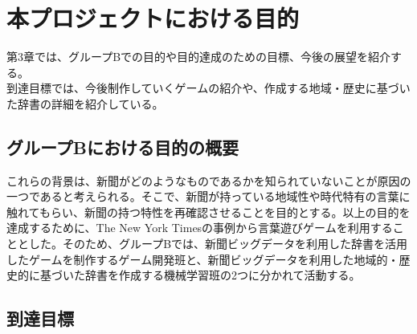 \chapter{本プロジェクトにおける目的}
第3章では、グループBでの目的や目的達成のための目標、今後の展望を紹介する。\\
到達目標では、今後制作していくゲームの紹介や、作成する地域・歴史に基づいた辞書の詳細を紹介している。
\section{グループBにおける目的の概要}
これらの背景は、新聞がどのようなものであるかを知られていないことが原因の一つであると考えられる。そこで、新聞が持っている地域性や時代特有の言葉に触れてもらい、新聞の持つ特性を再確認させることを目的とする。以上の目的を達成するために、The New York Timesの事例から言葉遊びゲームを利用することとした。そのため、グループBでは、新聞ビッグデータを利用した辞書を活用したゲームを制作するゲーム開発班と、新聞ビッグデータを利用した地域的・歴史的に基づいた辞書を作成する機械学習班の2つに分かれて活動する。

\section{到達目標}
